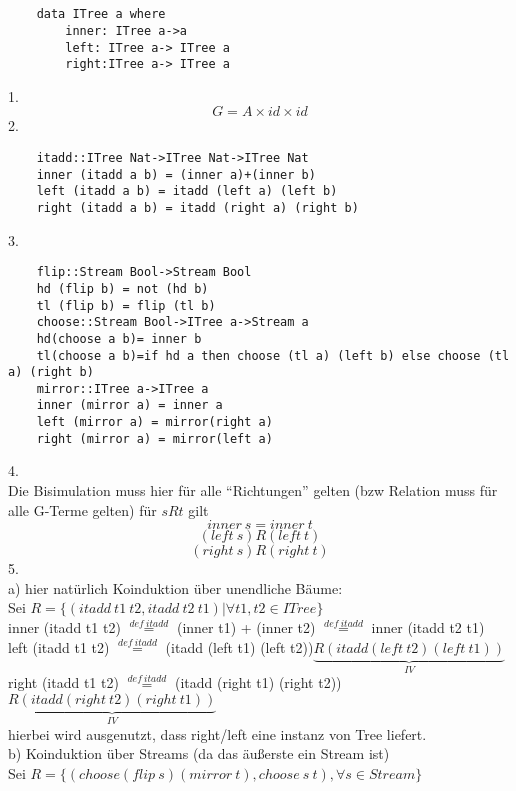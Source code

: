 \documentclass{article}
\begin{document}
	\section{}
	\begin{verbatim}
	data ITree a where
		inner: ITree a->a
		left: ITree a-> ITree a
		right:ITree a-> ITree a
	\end{verbatim}
	1.\\
	\[G=A\times id\times id\]
	2.\\
	\begin{verbatim}
	itadd::ITree Nat->ITree Nat->ITree Nat
	inner (itadd a b) = (inner a)+(inner b)
	left (itadd a b) = itadd (left a) (left b)
	right (itadd a b) = itadd (right a) (right b)
	\end{verbatim}
	3.\\
	\begin{verbatim}
	flip::Stream Bool->Stream Bool
	hd (flip b) = not (hd b)
	tl (flip b) = flip (tl b)
	choose::Stream Bool->ITree a->Stream a
	hd(choose a b)= inner b
	tl(choose a b)=if hd a then choose (tl a) (left b) else choose (tl a) (right b)
	mirror::ITree a->ITree a
	inner (mirror a) = inner a
	left (mirror a) = mirror(right a)
	right (mirror a) = mirror(left a)
	\end{verbatim}
	4.\\
	Die Bisimulation muss hier für alle ``Richtungen'' gelten (bzw Relation muss für alle G-Terme gelten) für $sRt$ gilt
	\[inner\ s = inner\ t\]
	\[(left\ s )R (left\ t)\]
	\[(right\ s )R (right\ t)\]
	5.\\
	a) hier natürlich Koinduktion über unendliche Bäume:\\
	Sei $R=\{(itadd\ t1\ t2, itadd\ t2\ t1)| \forall t1,t2\in ITree\}$\\
	inner (itadd t1 t2) $\stackrel{def\ itadd}{=}$ (inner t1) + (inner t2) $\stackrel{def\ itadd}{=}$ inner (itadd t2 t1)\\
	left (itadd t1 t2) $\stackrel{def\ itadd}{=}$ (itadd (left t1) (left t2))$\underbrace{R(itadd (left\ t2) (left\ t1))}_{IV}$\\
	right (itadd t1 t2) $\stackrel{def\ itadd}{=}$ (itadd (right t1) (right t2))$\underbrace{R(itadd (right\ t2) (right\ t1))}_{IV}$\\
	hierbei wird ausgenutzt, dass right/left eine instanz von Tree liefert.\\
	b) Koinduktion über Streams (da das äußerste ein Stream ist)\\
	Sei $R=\{(choose (flip\ s) (mirror\ t), choose\ s\ t),\forall s\in Stream\}$\\
\end{document}
